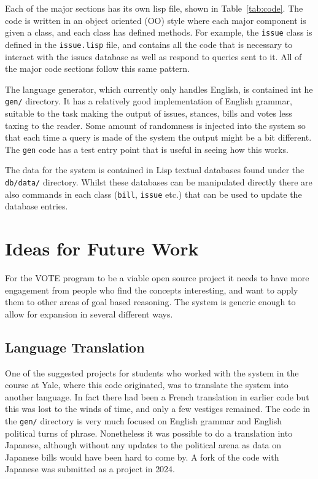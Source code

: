 \documentclass[10pt]{article}
\begin{document}
Each of the major sections has its own lisp file, shown in
Table~\ref{tab:code}.  The code is written in an object oriented (OO)
style where each major component is given a class, and each class has
defined methods.  For example, the \verb|issue| class is defined in
the \verb|issue.lisp| file, and contains all the code that is
necessary to interact with the issues database as well as respond to
queries sent to it.  All of the major code sections follow this same
pattern.

The language generator, which currently only handles English, is
contained int he \verb|gen/| directory.  It has a relatively good
implementation of English grammar, suitable to the task making the
output of issues, stances, bills and votes less taxing to the reader.
Some amount of randomness is injected into the system so that each
time a query is made of the system the output might be a bit
different.  The \verb|gen| code has a test entry point that is useful
in seeing how this works.

The data for the system is contained in Lisp textual databases found
under the \verb|db/data/| directory.  Whilst these databases can be
manipulated directly there are also commands in each class
(\verb|bill|, \verb|issue| etc.) that can be used to update the
database entries.

\section{Ideas for Future Work}
\label{sec:future}

For the VOTE program to be a viable open source project it needs to
have more engagement from people who find the concepts interesting,
and want to apply them to other areas of goal based reasoning.  The
system is generic enough to allow for expansion in several different
ways.

\subsection{Language Translation}
\label{sec:lang}

One of the suggested projects for students who worked with the system
in the course at Yale, where this code originated, was to translate
the system into another language.  In fact there had been a French
translation in earlier code but this was lost to the winds of time,
and only a few vestiges remained.  The code in the \verb|gen/|
directory is very much focused on English grammar and English
political turns of phrase.  Nonetheless it was possible to do a
translation into Japanese, although without any updates to the
political arena as data on Japanese bills would have been hard to come
by.  A fork of the code with Japanese was submitted as a project in
2024.
\end{document}
